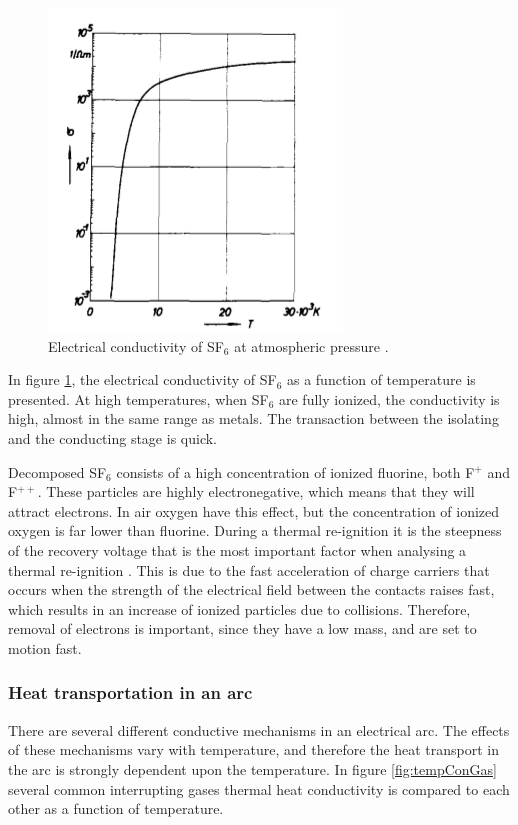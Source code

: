 \documentclass[10pt,a4paper,twoside]{article}
\begin{document}
\begin{figure}[H]
\centering
\includegraphics[scale=0.5]{Bilder/Theory/SF6Conduct.png}
\caption{Electrical conductivity of SF$_6$ at atmospheric pressure \cite{bib:IPSF6AQM}.} \label{fig:condSF6}
\end{figure}

In figure \ref{fig:condSF6}, the electrical conductivity of SF$_6$ as a function of temperature is presented. At high temperatures, when SF$_6$ are fully ionized, the conductivity is high, almost in the same range as metals. The transaction between the isolating and the conducting stage is quick. 

Decomposed SF$_6$ consists of a high concentration of ionized fluorine, both F$^{+}$ and F$^{++}$. These particles are highly electronegative, which means that they will attract electrons. In air oxygen have this effect, but the concentration of ionized oxygen is far lower than fluorine. During a thermal re-ignition it is the steepness of the recovery voltage that is the most important factor when analysing a thermal re-ignition \cite{bib:HVEbreak}. This is due to the fast acceleration of charge carriers that occurs when the strength of the electrical field between the contacts raises fast, which results in an increase of ionized particles due to collisions. Therefore, removal of electrons is important, since they have a low mass, and are set to motion fast.
   
\subsubsection{Heat transportation in an arc} \label{sec:HeatTransport}
There are several different conductive mechanisms in an electrical arc. The effects of these mechanisms vary with temperature, and therefore the heat transport in the arc is strongly dependent upon the temperature. In figure \ref{fig:tempConGas} several common interrupting gases thermal heat conductivity is compared to each other as a function of temperature.
\end{document}
